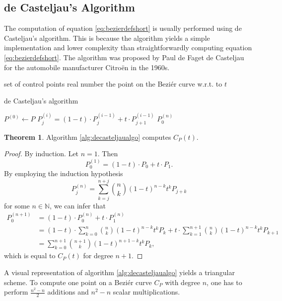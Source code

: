 \documentclass[a4paper, 11pt]{report}
\theoremstyle{definition}
\newtheorem{theorem}[definition]{Theorem}
\newcommand{\Desc}[2]{\State \makebox[12em][l]{#1}#2}
\begin{document}
\subsection{de Casteljau's Algorithm}

The computation of equation \ref{eq:bezierdefshort} is usually performed using de Casteljau's algorithm. This is because the algorithm yields a simple implementation and lower complexity than straightforwardly computing equation \ref{eq:bezierdefshort}. The algorithm was proposed by Paul de Faget de Casteljau for the automobile manufacturer Citroën in the 1960s.

\begin{algorithm}
	\begin{algorithmic}[1]
		\Input
			\Desc{$P = \{P_0, P_1, ..., P_n\}$}{set of control points}
			\Desc{$t$}{real number}
		\EndInput
		\Output
			\Desc{$P^{(n)}_0 = C_P(t)$}{the point on the Beziér curve w.r.t. to $t$}
		\EndOutput

		\caption{de Casteljau's algorithm}\label{alg:decasteljaualgo}
			\State $P^{(0)} \gets P$
					\State $P^{(i)}_j = (1-t) \cdot P^{(i-1)}_j + t \cdot P^{(i-1)}_{j+1}$
				\EndFor
			\EndFor
			\Return $P^{(n)}_0$
		\EndProcedure
	\end{algorithmic}
\end{algorithm}

\begin{theorem}
	Algorithm \ref{alg:decasteljaualgo} computes $C_P(t)$.
\end{theorem}
\begin{proof}
	By induction. Let $n = 1$. Then
		$$ P_0^{(1)} = (1-t) \cdot P_0 + t \cdot P_1.$$
	By employing the induction hypothesis
		$$ P_j^{(n)} = \sum_{k=j}^{n+j} \binom{n}{k} (1-t)^{n-k}t^k P_{j+k}$$
	for some $n \in \mathbb{N}$, we can infer that
	\begin{align*}
		P_0^{(n+1)}	&= (1-t) \cdot P_0^{(n)} + t \cdot P_1^{(n)} \\
					&= (1-t) \cdot \sum_{k=0}^{n} \binom{n}{k} (1-t)^{n-k}t^k P_{k} + t \cdot \sum_{k=1}^{n+1} \binom{n}{k} (1-t)^{n-k}t^k P_{k+1} \\
					&= \sum_{k=0}^{n+1} \binom{n+1}{k} (1-t)^{n+1-k}t^k P_{k},
	\end{align*}
	which is equal to $C_P(t)$ for degree $n+1$.
\end{proof}

A visual representation of algorithm \ref{alg:decasteljaualgo} yields a triangular scheme. To compute one point on a Beziér curve $C_P$ with degree $n$, one has to perform $\frac{n^2-n}{2}$ additions and $n^2-n$ scalar multiplications.
\end{document}
